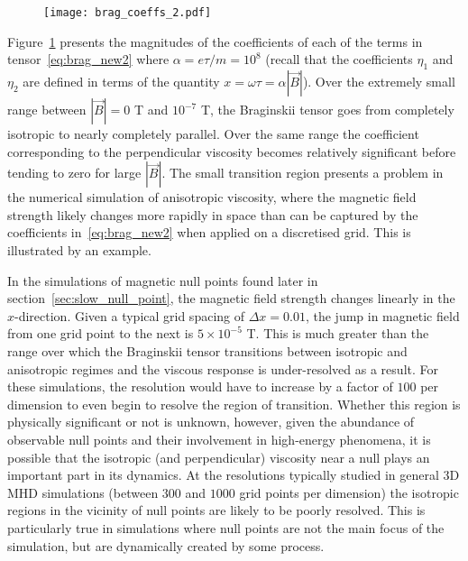 \begin{figure}[t]
  \centering
  \texttt{[image: brag\_coeffs\_2.pdf]}
  \label{fig:brag_coeffs2}
\end{figure}

Figure~\ref{fig:brag_coeffs2} presents the magnitudes of the coefficients of each of the terms in tensor~\eqref{eq:brag_new2} where $\alpha = e\tau/m = 10^{8}$ (recall that the coefficients $\eta_1$ and $\eta_2$ are defined in terms of the quantity $x = \omega \tau =\alpha |\vec{B}|$). Over the extremely small range between $|\vec{B}| = 0$ T and $10^{-7}$ T, the Braginskii tensor goes from completely isotropic to nearly completely parallel. Over the same range the coefficient corresponding to the perpendicular viscosity becomes relatively significant before tending to zero for large $|\vec{B}|$. The small transition region presents a problem in the numerical simulation of anisotropic viscosity, where the magnetic field strength likely changes more rapidly in space than can be captured by the coefficients in~\eqref{eq:brag_new2} when applied on a discretised grid. This is illustrated by an example.

In the simulations of magnetic null points found later in section~\ref{sec:slow_null_point}, the magnetic field strength changes linearly in the $x$-direction. Given a typical grid spacing of $\Delta x = 0.01$, the jump in magnetic field from one grid point to the next is $5\times 10^{-5}$ T. This is much greater than the range over which the Braginskii tensor transitions between isotropic and anisotropic regimes and the viscous response is under-resolved as a result. For these simulations, the resolution would have to increase by a factor of $100$ per dimension to even begin to resolve the region of transition. Whether this region is physically significant or not is unknown, however, given the abundance of observable null points and their involvement in high-energy phenomena, it is possible that the isotropic (and perpendicular) viscosity near a null plays an important part in its dynamics. At the resolutions typically studied in general 3D MHD simulations (between $300$ and $1000$ grid points per dimension) the isotropic regions in the vicinity of null points are likely to be poorly resolved. This is particularly true in simulations where null points are not the main focus of the simulation, but are dynamically created by some process.

